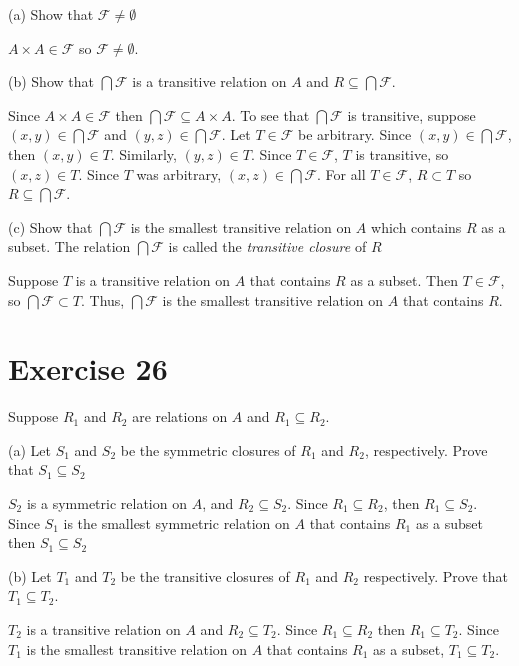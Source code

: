 \documentclass[11pt]{article}
\newcommand{\family}[1]{\mathcal{#1}}
\begin{document}
\noindent (a) Show that $\family{F} \neq \emptyset$

$A \times A \in \family{F}$ so $\family{F} \neq \emptyset$.

\noindent (b) Show that $\bigcap \family{F}$ is a transitive relation on $A$ and 
$R \subseteq \bigcap \family{F}$. 

Since $A \times A \in \family{F}$ then $\bigcap \family{F} \subseteq A \times A$.
To see that $\bigcap \family{F}$ is transitive, suppose 
$(x,y) \in \bigcap \family{F}$ and $(y,z) \in \bigcap \family{F}$. Let $T \in \family{F}$
be arbitrary. Since $(x,y) \in \bigcap \family{F}$, then $(x,y) \in T$. Similarly,
$(y,z) \in T$. Since $T \in \family{F}$, $T$ is transitive, so $(x,z) \in T$.
Since $T$ was arbitrary, $(x,z) \in \bigcap \family{F}$. For all 
$T \in \family{F}$, $R \subset T$ so $R \subseteq \bigcap \family{F}$.

\noindent (c) Show that $\bigcap \family{F}$ is the smallest transitive relation 
on $A$ which contains $R$ as a subset. The relation $\bigcap \family{F}$ is
called the \textit{transitive closure} of $R$

Suppose $T$ is a transitive relation on $A$ that contains $R$ as a subset. 
Then $T \in \family{F}$, so $\bigcap \family{F} \subset T$. Thus, 
$\bigcap \family{F}$ is the smallest transitive relation on $A$ that 
contains $R$.

\section*{Exercise 26}

Suppose $R_1$ and $R_2$ are relations on $A$ and $R_1 \subseteq R_2$.

\noindent (a) Let $S_1$ and $S_2$ be the symmetric closures of $R_1$ and $R_2$,
respectively. Prove that $S_1 \subseteq S_2$

$S_2$ is a symmetric relation on $A$, and $R_2 \subseteq S_2$. Since 
$R_1 \subseteq R_2$, then $R_1 \subseteq S_2$. Since $S_1$ is the smallest 
symmetric relation on $A$ that contains $R_1$ as a subset then $S_1 \subseteq S_2$

\noindent (b) Let $T_1$ and $T_2$ be the transitive closures of 
$R_1$ and $R_2$ respectively. Prove that $T_1 \subseteq T_2$.

$T_2$ is a transitive relation on $A$ and $R_2 \subseteq T_2$. Since 
$R_1 \subseteq R_2$ then $R_1 \subseteq T_2$. Since $T_1$ is the smallest 
transitive relation on $A$ that contains $R_1$ as a subset, $T_1 \subseteq T_2$.
\end{document}
